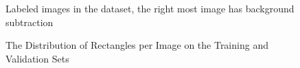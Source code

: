 \documentclass{article}
\begin{document}
\begin{figure}
\centering
{}
\caption{Labeled images in the dataset, the right most image has background subtraction}
\end{figure}

\begin{figure}
\centering
{}
\qquad
{}
\caption{The Distribution of Rectangles per Image on the Training and Validation Sets}
\label{fig:recdist}
\end{figure}
\end{document}
